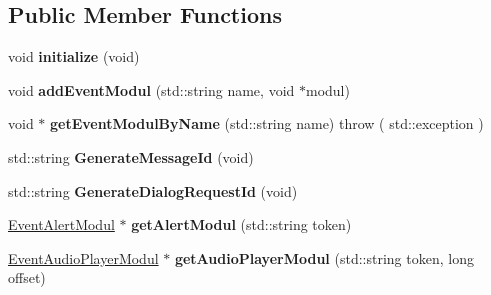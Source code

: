 \subsection*{Public Member Functions}
\begin{DoxyCompactItemize}
\item 
\mbox{\label{classAlexaEvent_1_1EventModulManager_a3a393245ef9767e3f534f7575d49212b}} 
void {\bfseries initialize} (void)
\item 
\mbox{\label{classAlexaEvent_1_1EventModulManager_ac03e2c748ec6c56a4350dd459072a04a}} 
void {\bfseries add\+Event\+Modul} (std\+::string name, void $\ast$modul)
\item 
\mbox{\label{classAlexaEvent_1_1EventModulManager_a4d6d806b4c55438b074144fc87c09a3e}} 
void $\ast$ {\bfseries get\+Event\+Modul\+By\+Name} (std\+::string name)  throw ( std\+::exception )
\item 
\mbox{\label{classAlexaEvent_1_1EventModulManager_a0daeba49126b47bc7e1be01a7d17f34e}} 
std\+::string {\bfseries Generate\+Message\+Id} (void)
\item 
\mbox{\label{classAlexaEvent_1_1EventModulManager_a869da5505e5608908725dbab37cdd24b}} 
std\+::string {\bfseries Generate\+Dialog\+Request\+Id} (void)
\item 
\mbox{\label{classAlexaEvent_1_1EventModulManager_a6917e03609d0daf1b7800f8a4a5f3d95}} 
\hyperlink{classAlexaEvent_1_1EventAlertModul}{Event\+Alert\+Modul} $\ast$ {\bfseries get\+Alert\+Modul} (std\+::string token)
\item 
\mbox{\label{classAlexaEvent_1_1EventModulManager_acaeb7aba998044c9252069739dc0d428}} 
\hyperlink{classAlexaEvent_1_1EventAudioPlayerModul}{Event\+Audio\+Player\+Modul} $\ast$ {\bfseries get\+Audio\+Player\+Modul} (std\+::string token, long offset)
\item 
\mbox{\label{classAlexaEvent_1_1EventModulManager_ada23f9a805bdd3d7dc2ad34b675c99df}} 

\end{DoxyCompactItemize}
